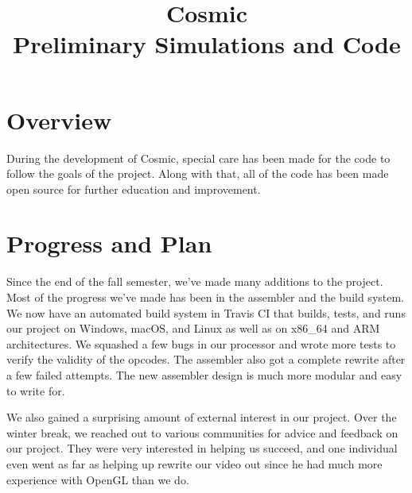 \documentclass[conference]{IEEEtran}
\begin{document}
\title{
 Cosmic\\Preliminary Simulations and Code}

\author{
\and
{}

}

\maketitle

\section{Overview}
During the development of Cosmic, special care has been made for the code to follow the goals of the project. Along with that, all of the code has been made open source for further education and improvement.

\section{Progress and Plan}
Since the end of the fall semester, we've made many additions to the project. Most of the progress we've made has been in the assembler and the build system. We now have an automated build system in Travis CI that builds, tests, and runs our project on Windows, macOS, and Linux as well as on x86\_64 and ARM architectures. We squashed a few bugs in our processor and wrote more tests to verify the validity of the opcodes. The assembler also got a complete rewrite after a few failed attempts. The new assembler design is much more modular and easy to write for.

We also gained a surprising amount of external interest in our project. Over the winter break, we reached out to various communities for advice and feedback on our project. They were very interested in helping us succeed, and one individual even went as far as helping up rewrite our video out since he had much more experience with OpenGL than we do.
\end{document}
